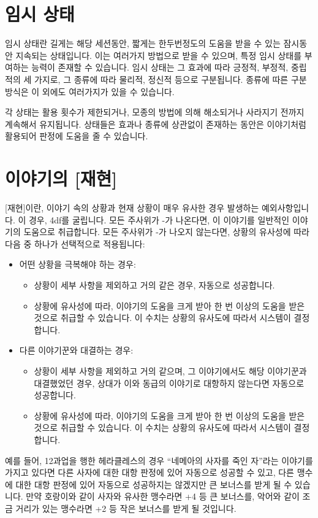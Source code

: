 \documentclass[12pt]{report}
\begin{document}
	\section*{임시 상태}
	임시 상태란 길게는 해당 세션동안, 짧게는 한두번정도의 도움을 받을 수 있는 잠시동안 지속되는 상태입니다. 이는 여러가지 방법으로 받을 수 있으며, 특정 임시 상태를 부여하는 능력이 존재할 수 있습니다. 임시 상태는 그 효과에 따라 긍정적, 부정적, 중립적의 세 가지로, 그 종류에 따라 물리적, 정신적 등으로 구분됩니다. 종류에 따른 구분 방식은 이 외에도 여러가지가 있을 수 있습니다.
	
	각 상태는 활용 횟수가 제한되거나, 모종의 방법에 의해 해소되거나 사라지기 전까지 계속해서 유지됩니다. 상태들은 효과나 종류에 상관없이 존재하는 동안은 이야기처럼 활용되어 판정에 도움을 줄 수 있습니다.
	
	\section*{이야기의 [재현]}
	[재현]이란, 이야기 속의 상황과 현재 상황이 매우 유사한 경우 발생하는 예외사항입니다. 이 경우, 4df를 굴립니다. 모든 주사위가 -가 나온다면, 이 이야기를 일반적인 이야기의 도움으로 취급합니다. 모든 주사위가 -가 나오지 않는다면, 상황의 유사성에 따라 다음 중 하나가 선택적으로 적용됩니다:
	\begin{itemize}
		\item 어떤 상황을 극복해야 하는 경우:
		
		\begin{itemize}
			\item 상황이 세부 사항을 제외하고 거의 같은 경우, 자동으로 성공합니다.
			\item 상황에 유사성에 따라, 이야기의 도움을 크게 받아 한 번 이상의 도움을 받은 것으로 취급할 수 있습니다. 이 수치는 상황의 유사도에 따라서 시스템이 결정합니다.
		\end{itemize}
		
		\item 다른 이야기꾼와 대결하는 경우:
		
		\begin{itemize}
			\item 상황이 세부 사항을 제외하고 거의 같으며, 그 이야기에서도 해당 이야기꾼과 대결했었던 경우, 상대가 이와 동급의 이야기로 대항하지 않는다면 자동으로 성공합니다.
			\item 상황에 유사성에 따라, 이야기의 도움을 크게 받아 한 번 이상의 도움을 받은 것으로 취급할 수 있습니다. 이 수치는 상황의 유사도에 따라서 시스템이 결정합니다.
		\end{itemize}
	\end{itemize}
	예를 들어, 12과업을 행한 헤라클레스의 경우 “네메아의 사자를 죽인 자”라는 이야기를 가지고 있다면 다른 사자에 대한 대항 판정에 있어 자동으로 성공할 수 있고, 다른 맹수에 대한 대항 판정에 있어 자동으로 성공하지는 않겠지만 큰 보너스를 받게 될 수 있습니다. 만약 호랑이와 같이 사자와 유사한 맹수라면 +4 등 큰 보너스를, 악어와 같이 조금 거리가 있는 맹수라면 +2 등 작은 보너스를 받게 될 것입니다.
	
\end{document}
